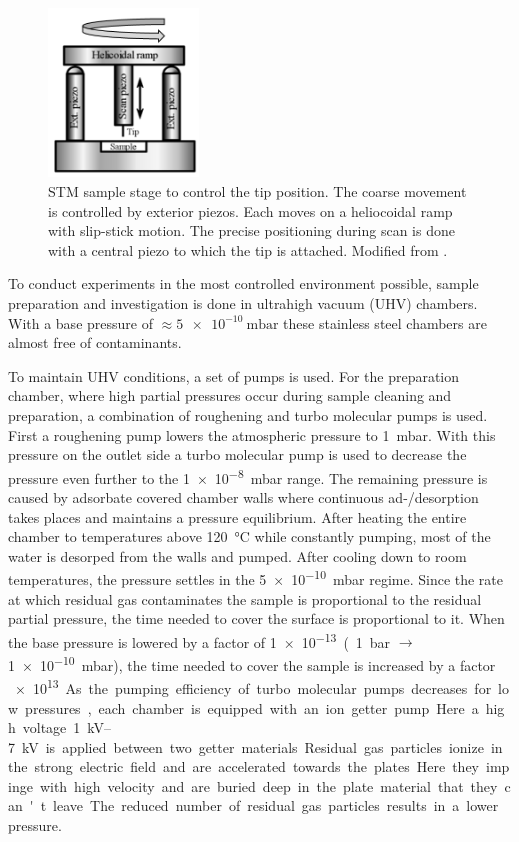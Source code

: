 \begin{figure} \centering
	\includegraphics[width=4cm]{./images/STM-sketch-2}
	\caption{STM sample stage to control the tip position. The coarse movement is controlled by exterior piezos. Each moves on a heliocoidal ramp with slip-stick motion. The precise positioning during scan is done with a central piezo to which the tip is attached. Modified from \cite{heliocoidal_ramp_2018}.}
	\label{fig:stm-heliocoidal-ramp}
\end{figure}

To conduct experiments in the most controlled environment possible, sample preparation and investigation is done in ultrahigh vacuum (UHV) chambers. With a base pressure of $\approx \SI{5e-10}{\milli \bar}$ these stainless steel chambers are almost free of contaminants. 

To maintain UHV conditions, a set of pumps is used. For the preparation chamber, where high partial pressures occur during sample cleaning and preparation, a combination of roughening and turbo molecular pumps is used. First a roughening pump lowers the atmospheric pressure to \SI{1}{\milli \bar}. With this pressure on the outlet side a turbo molecular pump is used to decrease the pressure even further to the  \SI{1e-8}{\milli \bar} range. The remaining pressure is caused by adsorbate covered chamber walls where continuous ad-/desorption takes places and maintains a pressure equilibrium. After heating the entire chamber to temperatures above \SI{120}{\celsius} while constantly pumping, most of the water is desorped from the walls and pumped. After cooling down to room temperatures, the pressure settles in the \SI{5e-10}{\milli \bar} regime. Since the rate at which residual gas contaminates the sample is proportional to the residual partial pressure, the time needed to cover the surface is proportional to it. When the base pressure is lowered by a factor of \SI{1e-13} (\SI{1}{\bar} $\rightarrow$ \SI{1e-10}{\milli \bar}), the time needed to cover the sample is increased by a factor \SI{e13}. 

As the pumping efficiency of turbo molecular pumps decreases for low pressures, each chamber is equipped with an ion getter pump. Here a high voltage \SIrange{1}{7}{\kilo \volt} is applied between two getter materials. Residual gas particles ionize in the strong electric field and are accelerated towards the plates. Here they impinge with high velocity and are buried deep in the plate material that they can't leave. The reduced number of residual gas particles results in a lower pressure.

